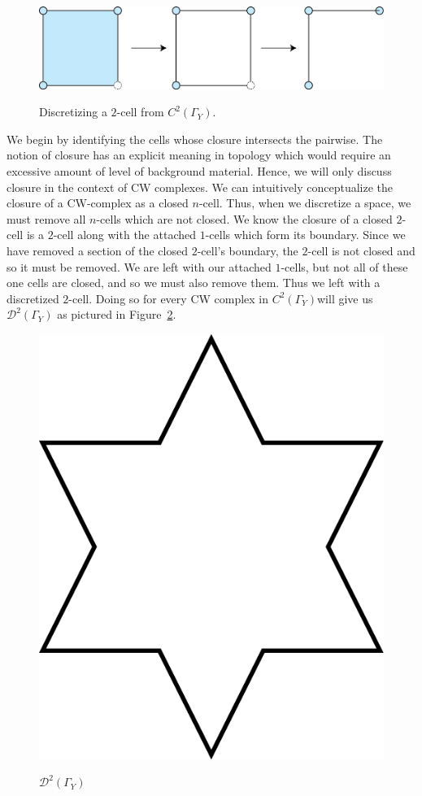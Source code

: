 \documentclass[12pt,oneside]{amsbook}
\newcommand{\Y}{\Gamma_Y}
\newcommand{\C}{$C^2(\Y)$}
\begin{document}
\begin{figure}[h]
\centering
\caption{Discretizing a $2$-cell from \C.}
\vspace{2mm}
\includegraphics[scale=.8]{2_Cell_Example.png}
\label{fig:d_2cell}
\end{figure}

We begin by identifying the cells whose closure intersects the pairwise. The notion of closure has an explicit meaning in topology which would require an excessive amount of level of background material. Hence, we will only discuss closure in the context of CW complexes. We can intuitively conceptualize the closure of a CW-complex as a closed $n$-cell. Thus, when we discretize a space, we must remove all $n$-cells which are not closed. We know the closure of a closed $2$-cell is a $2$-cell along with the attached $1$-cells which form its boundary. Since we have removed a section of the closed $2$-cell's boundary, the $2$-cell is not closed and so it must be removed. We are left with our attached $1$-cells, but not all of these one cells are closed, and so we must also remove them. Thus we left with a discretized $2$-cell. Doing so for every CW complex in \C will give us $\mathcal{D}^2(\Y)$ as pictured in Figure~\ref{fig:star}.

\begin{figure}[h]
\centering
\caption{$\mathcal{D}^2(\Y)$}
\includegraphics[scale=.5]{discretized.png}
\label{fig:star}
\end{figure}
\end{document}
